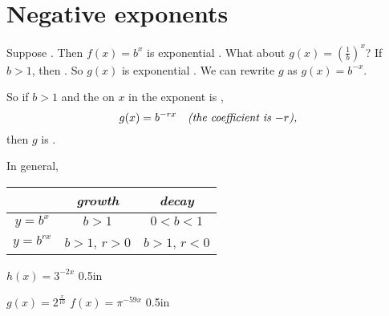 \section{Negative exponents}

Suppose .
Then $f(x) = b^x$ is exponential .
What about $g(x) = \left(\frac{1}{b}\right)^x$?
If $b>1$, 
then .
So $g(x)$ is exponential .
We can rewrite $g$ as $g(x) = b^{-x}$. 

\begin{tcolorbox}[center,colback=white,width=6.5in,]
    So
    if $b>1$ and the  on $x$ in the exponent is ,
    \[ g(x) = b^{-rx} \quad\text{\itshape (the coefficient is $-r$),} \]
    then $g$ is 
    .
\end{tcolorbox}


In general,
\begin{center}
    \renewcommand{\arraystretch}{1.25}
    \Large
    \begin{tabular}{c||c|c}
        {} & {\bfseries\itshape growth} & {\bfseries\itshape  decay} \\
        \hline
        $y=b^x$ &  $b>1$ & $0<b<1$ \\
        $y=b^{rx}$
            & 
            $b>1$, \quad $r>0$
            &
            $b>1$, \quad $r<0$
            \\
    \end{tabular}
\end{center}

{
    $h(x) = 3^{-2x}$    
}
{0.5in}

\myProblems
{
    $g(x) = 2^{\frac{x}{10}}$    
}
{
    $f(x) = \pi^{-59x}$   
}
{0.5in}
